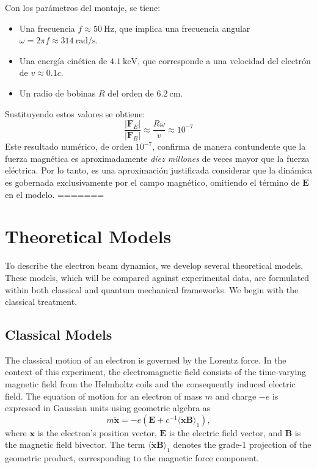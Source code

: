 Con los parámetros del montaje, se tiene:
%
\begin{itemize}
	\item Una frecuencia $f \approx \qty{50}{\hertz}$, que implica una frecuencia
		angular $\omega = 2\pi f \approx \qty{314}{\radian\per\second}$.
	\item Una energía cinética de $\qty{4.1}{\kilo\eV}$, que corresponde a una
		velocidad del electrón de $v \approx 0.1c$.
	\item Un radio de bobinas $R$ del orden de $\qty{6.2}{\centi\meter}$.
\end{itemize}
%
Sustituyendo estos valores se obtiene:
%
$$
\frac{|\boldsymbol{F}_E|}{|\boldsymbol{F}_B|} \approx \frac{R\omega}{v}
\approx 10^{-7}
$$
%
Este resultado numérico, de orden $10^{-7}$, confirma de manera
contundente que la fuerza magnética es aproximadamente \emph{diez millones} de
veces mayor que la fuerza eléctrica. Por lo tanto, es una aproximación
justificada considerar que la dinámica es gobernada
exclusivamente por el campo magnético, omitiendo el término de
$\boldsymbol{E}$ en el modelo.
=======
\section{Theoretical Models}
\label{sec:TheoreticalModels}

To describe the electron beam dynamics, we develop several theoretical models.
These models, which will be compared against experimental data, are formulated
within both classical and quantum mechanical frameworks. We begin with the
classical treatment.

\subsection{Classical Models}
\label{sub:ClassicalModels}

The classical motion of an electron is governed by the Lorentz force. In the
context of this experiment, the electromagnetic field consists of the
time-varying magnetic field from the Helmholtz coils and the consequently
induced electric field. The equation of motion for an electron of mass $m$ and
charge $-e$ is expressed in Gaussian units using geometric algebra as
\begin{equation}
	m \ddot{\boldsymbol{x}} = -e \left( \boldsymbol{E}
	+ c^{-1} \langle \dot{\boldsymbol{x}} \boldsymbol{B} \rangle_{1} \right),
	\label{eq:lorentz-force}
\end{equation}
where $\boldsymbol{x}$ is the electron's position vector, $\boldsymbol{E}$ is
the electric field vector, and $\boldsymbol{B}$ is the magnetic field
bivector. The term $\langle \dot{\boldsymbol{x}} \boldsymbol{B} \rangle_{1}$
denotes the grade-1 projection of the geometric product, corresponding to the
magnetic force component.

